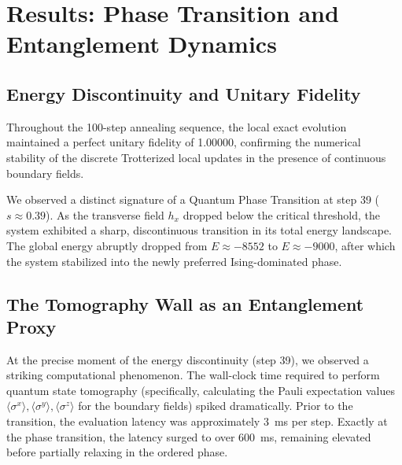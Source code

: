 \documentclass[aps,pra,reprint,superscriptaddress,nofootinbib]{revtex4-2}
\begin{document}
\section{Results: Phase Transition and Entanglement Dynamics}

\subsection{Energy Discontinuity and Unitary Fidelity}
Throughout the 100-step annealing sequence, the local exact evolution maintained a perfect unitary fidelity of 1.00000, confirming the numerical stability of the discrete Trotterized local updates in the presence of continuous boundary fields.

We observed a distinct signature of a Quantum Phase Transition at step 39 ($s \approx 0.39$). As the transverse field $h_x$ dropped below the critical threshold, the system exhibited a sharp, discontinuous transition in its total energy landscape. The global energy abruptly dropped from $E \approx -8552$ to $E \approx -9000$, after which the system stabilized into the newly preferred Ising-dominated phase.


\subsection{The Tomography Wall as an Entanglement Proxy}
At the precise moment of the energy discontinuity (step 39), we observed a striking computational phenomenon. The wall-clock time required to perform quantum state tomography (specifically, calculating the Pauli expectation values $\langle \sigma^x \rangle, \langle \sigma^y \rangle, \langle \sigma^z \rangle$ for the boundary fields) spiked dramatically. Prior to the transition, the evaluation latency was approximately 3~ms per step. Exactly at the phase transition, the latency surged to over 600~ms, remaining elevated before partially relaxing in the ordered phase.
\end{document}
